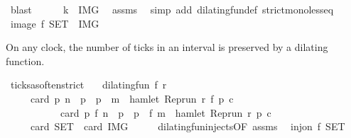 \begin{isabellebody}
\ blast\isanewline
\ \ \ \ \isamarkupfalse%
\ {\isacartoucheopen}k\ {\isasymin}\ {\isacharquery}IMG{\isacartoucheclose}\ \isamarkupfalse%
\ assms\ \isamarkupfalse%
\ {\isacharparenleft}simp\ add{\isacharcolon}\ dilating{\isacharunderscore}fun{\isacharunderscore}def\ strict{\isacharunderscore}mono{\isacharunderscore}less{\isacharunderscore}eq{\isacharparenright}\isanewline
\ \ \isacommand{{\isacharbraceright}}\isamarkupfalse%
\ \isamarkupfalse%
\ {\isacartoucheopen}image\ f\ {\isacharquery}SET\ {\isasymsubseteq}\ {\isacharquery}IMG{\isacartoucheclose}\ \isacommand{{\isachardot}{\isachardot}}\isamarkupfalse%
\isanewline
{}\isamarkupfalse%
%
\endisatagproof
{\isafoldproof}%
%
\isadelimproof
%
\endisadelimproof
%
\begin{isamarkuptext}%
On any clock, the number of ticks in an interval is preserved
  by a dilating function.%
\end{isamarkuptext}\isamarkuptrue%
\isamarkupfalse%
\ ticks{\isacharunderscore}as{\isacharunderscore}often{\isacharunderscore}strict{\isacharcolon}\isanewline
\ \ \ {\isacartoucheopen}dilating{\isacharunderscore}fun\ f\ r{\isacartoucheclose}\isanewline
\ \ \ \ \ {\isacartoucheopen}card\ {\isacharbraceleft}p{\isachardot}\ n\ {\isacharless}\ p\ {\isasymand}\ p\ {\isacharless}\ m\ {\isasymand}\ hamlet\ {\isacharparenleft}{\isacharparenleft}Rep{\isacharunderscore}run\ r{\isacharparenright}\ {\isacharparenleft}f\ p{\isacharparenright}\ c{\isacharparenright}{\isacharbraceright}\isanewline
\ \ \ \ \ \ \ \ \ \ {\isacharequal}\ card\ {\isacharbraceleft}p{\isachardot}\ f\ n\ {\isacharless}\ p\ {\isasymand}\ p\ {\isacharless}\ f\ m\ {\isasymand}\ hamlet\ {\isacharparenleft}{\isacharparenleft}Rep{\isacharunderscore}run\ r{\isacharparenright}\ p\ c{\isacharparenright}{\isacharbraceright}{\isacartoucheclose}\isanewline
\ \ \ \ {\isacharparenleft}\ {\isacartoucheopen}card\ {\isacharquery}SET\ {\isacharequal}\ card\ {\isacharquery}IMG{\isacartoucheclose}{\isacharparenright}\isanewline
%
\isadelimproof
%
\endisadelimproof
%
\isatagproof
{}\isamarkupfalse%
\ {\isacharminus}\isanewline
\ \ \isamarkupfalse%
\ dilating{\isacharunderscore}fun{\isacharunderscore}injects{\isacharbrackleft}OF\ assms{\isacharbrackright}\ \isamarkupfalse%
\ {\isacartoucheopen}inj{\isacharunderscore}on\ f\ {\isacharquery}SET{\isacartoucheclose}\ \isacommand{{\isachardot}}\isamarkupfalse%
\isanewline
\ \ \isamarkupfalse%

\end{isabellebody}
